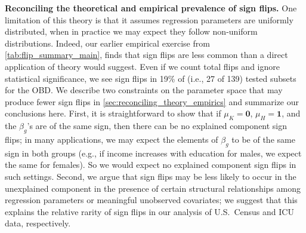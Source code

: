 \textbf{Reconciling the theoretical and empirical prevalence of sign flips.}
One limitation of this theory is that it assumes regression parameters are uniformly distributed, when in practice we may expect they follow non-uniform distributions.
Indeed, our earlier empirical exercise from \cref{tab:flip_summary_main}, finds that sign flips are less common than a direct application of theory would suggest.
Even if we count total flips and ignore statistical significance, we see sign flips in 19\% of (i.e., 27 of 139) tested subsets for the OBD.
We describe two constraints on the parameter space that may produce fewer sign flips in \cref{sec:reconciling_theory_empirics} and summarize our conclusions here.
First, it is straightforward to show that if $\mu_K = \mathbf{0}$, $\mu_H = \mathbf{1}$, and the $\beta_g$'s are of the same sign, then there can be no explained component sign flips; in many applications, we may expect the elements of $\beta_g$ to be of the same sign in both groups (e.g., if income increases with education for males, we expect the same for females). So we would expect no explained component sign flips in such settings.
Second, we argue that sign flips may be less likely to occur in the unexplained component in the presence of certain structural relationships among regression parameters or meaningful unobserved covariates; we suggest that this explains the relative rarity of sign flips in our analysis of U.S.\ Census and ICU data, respectively.


